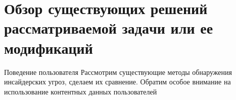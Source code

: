 \section{Обзор существующих решений рассматриваемой зада­чи или ее модификаций}
Поведение пользователя
Рассмотрим существующие методы обнаружения инсайдерских угроз, сделаем их сравнение. Обратим особое внимание на использование контентных данных пользователей
\clearpage